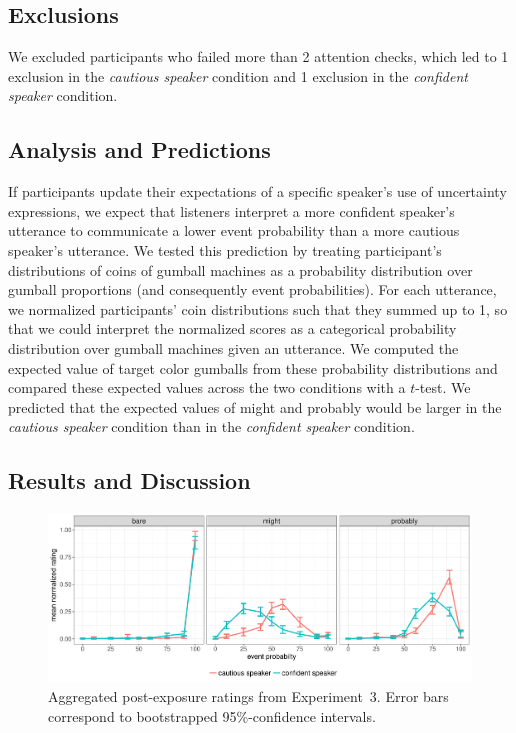 \documentclass[man, floatsintext]{apa6}
\begin{document}
\subsection{Exclusions}

We excluded participants who failed more than 2 attention checks, which led to 1 exclusion in the \emph{cautious speaker} condition and 1 exclusion in the \emph{confident speaker} condition.


\subsection{Analysis and Predictions}

If participants update their expectations of a specific speaker's use of uncertainty expressions,  we expect that listeners interpret a more confident speaker's utterance 
to communicate a lower event probability than a more cautious speaker's utterance. We tested this prediction by treating participant's distributions of coins 
of gumball machines as a probability distribution over gumball proportions (and consequently event probabilities).  For each utterance, we 
normalized participants' coin distributions such that they summed up to 1, so that we could interpret the normalized scores 
as a categorical probability distribution over gumball machines given an utterance. We computed the expected value of target color gumballs 
from these probability distributions and compared these expected values across the two conditions with a $t$-test. We predicted that the expected values of 
{\sc might} and {\sc probably} would be larger in the \emph{cautious speaker} condition than in the \emph{confident speaker} condition.

\subsection{Results and Discussion}

\begin{figure}
\includegraphics[width=\textwidth]{plots/exp-2-ratings.pdf}
\caption{Aggregated post-exposure ratings from Experiment~3. Error bars correspond to bootstrapped 95\%-confidence intervals.  \label{fig:adaptation-results-comp}}
\end{figure}
\end{document}
